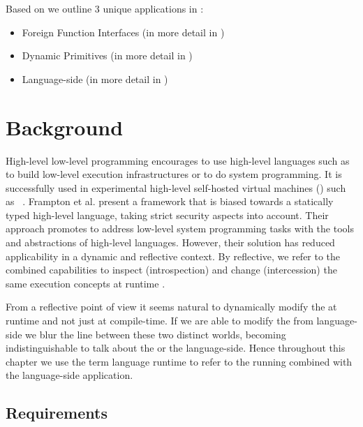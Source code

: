 \noindent Based on \B we outline 3 unique applications in :
\begin{itemize}[noitemsep]
	\item Foreign Function Interfaces (in more detail in )
	\item Dynamic Primitives (in more detail in  )
	\item Language-side \JIT (in more detail in  )
\end{itemize}


\section{Background}
High-level low-level programming \cite{Fram09a} encourages to use high-level languages such as \Java to build low-level execution infrastructures or to do system programming. 
It is successfully used in experimental high-level self-hosted virtual machines (\VMs) such as \Jikes~\cite{Alpe99a}.  
Frampton et al. present a framework that is biased towards a statically typed high-level language, taking strict security aspects into account.
Their approach promotes to address low-level system programming tasks with the tools and abstractions of high-level languages.
However, their solution has reduced applicability in a dynamic and reflective context.
By reflective, we refer to the combined capabilities to inspect (introspection) and change (intercession) the same execution concepts at runtime \cite{Maes87a}.

From a reflective point of view it seems natural to dynamically modify the \VM at runtime and not just at compile-time.
If we are able to modify the \VM from language-side we blur the line between these two distinct worlds, becoming indistinguishable to talk about the \VM or the language-side.
Hence throughout this chapter we use the term language runtime to refer to the running \VM combined with the language-side application.


\subsection{Requirements}

